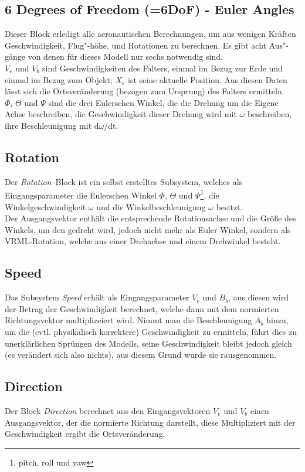 \documentclass[titlepage, a4paper, ngerman]{article}
\begin{document}
\subsection{6 Degrees of Freedom (=6DoF) - Euler Angles}
Dieser Block erledigt alle aeronautischen Berechnungen, um aus wenigen Kräften Geschwindigkeit, Flug"-höhe, und Rotationen zu berechnen. Es gibt acht Aus"-gänge von denen für dieses Modell nur sechs notwendig sind.\\
$V_{e}$ und $V_{b}$ sind Geschwindigkeiten des Falters, einmal im Bezug zur Erde und einmal im Bezug zum Objekt; $X_{e}$ ist seine aktuelle Position. Aus diesen Daten lässt sich die Ortsveränderung (bezogen zum Ursprung) des Falters ermitteln.\\
$\Phi$, $\Theta$ und $\Psi$  sind die drei Eulerschen Winkel, die die Drehung um die Eigene Achse beschreiben, die Geschwindigkeit dieser Drehung wird mit $\omega$ beschreiben, ihre Beschleunigung mit d$\omega$/dt.

\subsection{Rotation}
Der {\em Rotation}--Block ist ein selbst erstelltes Subsystem, welches als Eingangsparameter die Eulerschen Winkel $\Phi$, $\Theta$ und $\Psi$\footnote{pitch, roll und yaw}, die Winkelgeschwindigkeit $\omega$ und die Winkelbeschleunigung $\omega$ besitzt.\\
Der Ausgangsvektor enthält die entsprechende Rotationsachse und die Größe des Winkels, um den gedreht wird, jedoch nicht mehr als Euler Winkel, sondern als VRML-Rotation, welche aus einer Drehachse und einem Drehwinkel besteht.

\subsection{Speed}
Das Subsystem {\em Speed} erhält als Eingangsparameter $V_e$ und $B_b$, aus diesen wird der Betrag der Geschwindigkeit berechnet, welche dann mit dem normierten Richtungsvektor multiplizeiert wird. Nimmt man die Beschleunigung $A_b$ hinzu, um die (evtl. physikalisch korrektere) Geschwindigkeit zu ermitteln, führt dies zu unerklärlichen Sprüngen des Modells, seine Geschwindigkeit bleibt jedoch gleich (es verändert sich also nichts), aus diesem Grund wurde sie rausgenommen.

\subsection{Direction}
Der Block {\em Direction} berechnet aus den Eingangsvektoren $V_e$ und $V_b$ einen Ausgangsvektor, der die normierte Richtung darstellt, diese Multipliziert mit der Geschwindigkeit ergibt die Ortsveränderung.
\end{document}

